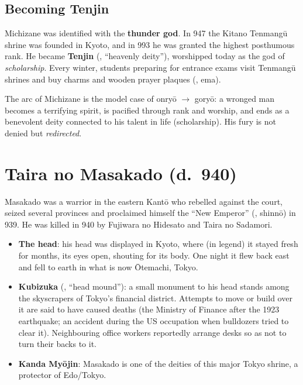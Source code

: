 \subsection{Becoming Tenjin}

Michizane was identified with the \textbf{thunder god}. In 947 the Kitano Tenmangū shrine
was founded in Kyoto, and in 993 he was granted the highest posthumous rank. He became
\textbf{Tenjin} (, ``heavenly deity''), worshipped today as the god of
\emph{scholarship}. Every winter, students preparing for entrance exams visit Tenmangū
shrines and buy charms and wooden prayer plaques (, ema).

\begin{important}
The arc of Michizane is the model case of onryō $\to$ goryō: a wronged man becomes a
terrifying spirit, is pacified through rank and worship, and ends as a benevolent deity
connected to his talent in life (scholarship). His fury is not denied but \emph{redirected}.
\end{important}

\section{Taira no Masakado (d.\ 940)}

Masakado was a warrior in the eastern Kantō who rebelled against the court, seized
several provinces and proclaimed himself the ``New Emperor'' (, shinnō) in 939. He
was killed in 940 by Fujiwara no Hidesato and Taira no Sadamori.

\begin{itemize}
  \item \textbf{The head}: his head was displayed in Kyoto, where (in legend) it stayed
        fresh for months, its eyes open, shouting for its body. One night it flew back east
        and fell to earth in what is now Ōtemachi, Tokyo.
  \item \textbf{Kubizuka} (, ``head mound''): a small monument to his head stands
        among the skyscrapers of Tokyo's financial district. Attempts to move or build over it
        are said to have caused deaths (the Ministry of Finance after the 1923 earthquake;
        an accident during the US occupation when bulldozers tried to clear it).
        Neighbouring office workers reportedly arrange desks so as not to turn their backs
        to it.
  \item \textbf{Kanda Myōjin}: Masakado is one of the deities of this major Tokyo shrine,
        a protector of Edo/Tokyo.
\end{itemize}

